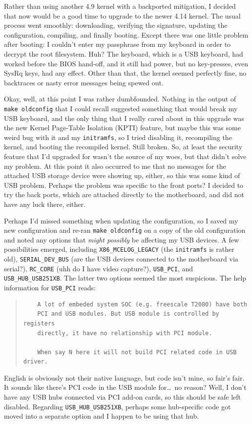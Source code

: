 \documentclass{article}
\begin{document}
Rather than using another 4.9 kernel with a backported mitigation, I decided that now would be a good time to upgrade to the newer 4.14 kernel.  The usual process went smoothly: downloading, verifying the signature, updating the configuration, compiling, and finally booting.  Except there was one little problem after booting: I couldn't enter my passphrase from my keyboard in order to decrypt the root filesystem.  Huh?  The keyboard, which is a USB keyboard, had worked before the BIOS hand-off, and it still had power, but no key-presses, even SysRq keys, had any effect.  Other than that, the kernel seemed perfectly fine, no backtraces or nasty error messages being spewed out.

Okay, well, at this point I was rather dumbfounded.  Nothing in the output of \texttt{make oldconfig} that I could recall suggested something that would break my USB keyboard, and the only thing that I really cared about in this upgrade was the new Kernel Page-Table Isolation (KPTI) feature, but maybe this was some weird bug with it and my \texttt{initramfs}, so I tried disabling it, recompiling the kernel, and booting the recompiled kernel.  Still broken.  So, at least the security feature that I'd upgraded for wasn't the source of my woes, but that didn't solve my problem.  At this point it also occurred to me that no messages for the attached USB storage device were showing up, either, so this was some kind of USB problem.  Perhaps the problem was specific to the front ports?  I decided to try the back ports, which are attached directly to the motherboard, and did not have any luck there, either.

Perhaps I'd missed something when updating the configuration, so I saved my new configuration and re-ran \texttt{make oldconfig} on a copy of the old configuration and noted any options that \textit{might possibly} be affecting my USB devices.  A few possibilities emerged, including \texttt{X86_MCELOG_LEGACY} (the \texttt{initramfs} is rather old), \texttt{SERIAL_DEV_BUS} (are the USB devices connected to the motherboard via serial?), \texttt{RC_CORE} (uhh do I have video capture?), \texttt{USB_PCI}, and \texttt{USB_HUB_USB251XB}.  The latter two options seemed the most suspicious.  The help information for \texttt{USB_PCI} reads:
\begin{quote}
\begin{verbatim}
	A lot of embeded system SOC (e.g. freescale T2080) have both
	PCI and USB modules. But USB module is controlled by registers
	directly, it have no relationship with PCI module.

	When say N here it will not build PCI related code in USB driver.
\end{verbatim}
\end{quote}
English is obviously not their native language, but code isn't mine, so fair's fair.  It sounds like there's PCI code in the USB module for\ldots~no reason?  Well, I don't have any USB hubs connected via PCI add-on cards, so this should be safe left disabled.  Regarding \texttt{USB_HUB_USB251XB}, perhaps some hub-specific code got moved into a separate option and I happen to be using that hub.
\end{document}
